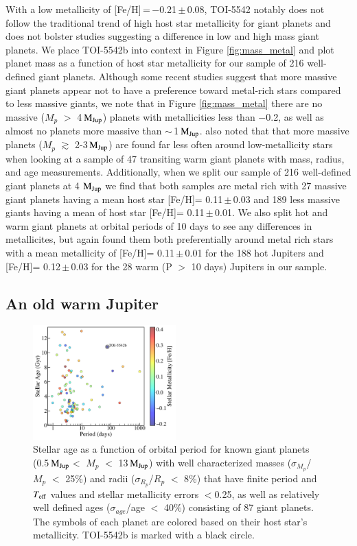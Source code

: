 \documentclass{aa}
\newcommand{\feh}{\mbox{[Fe/H]}\xspace}
\newcommand{\teff}{\ensuremath{T_{\rm eff}}\xspace}
\newcommand{\mjup}{\mbox{$\mathrm{M_{\rm Jup}}$}\xspace}
\begin{document}
With a low metallicity of \feh\,=\,$-$0.21\,$\pm$\,0.08, TOI-5542 notably does not follow the traditional trend of high host star metallicity for giant planets and does not bolster studies suggesting a difference in low and high mass giant planets. We place TOI-5542b into context in Figure \ref{fig:mass_metal} and plot planet mass as a function of host star metallicity for our sample of 216 well-defined giant planets. Although some recent studies suggest that more massive giant planets appear not to have a preference toward metal-rich stars compared to less massive giants, we note that in Figure \ref{fig:mass_metal} there are no massive ($M_{p}$ $>$ 4\,\mjup) planets with metallicities less than $-$0.2, as well as almost no planets more massive than $\sim$\,1\,\mjup. \citet{Thorngren2016} also noted that that more massive planets ($M_{p}$ $\gtrsim$ 2-3\,\mjup) are found far less often around low-metallicity stars when looking at a sample of 47 transiting warm giant planets with mass, radius, and age measurements. Additionally, when we split our sample of 216 well-defined giant planets at 4 \mjup we find that both samples are metal rich with 27 massive giant planets having a mean host star \feh = 0.11\,$\pm$\,0.03 and 189 less massive giants having a mean of host star \feh = 0.11\,$\pm$\,0.01. We also split hot and warm giant planets at orbital periods of 10 days to see any differences in metallicites, but again found them both preferentially around metal rich stars with a mean metallicity of \feh = 0.11\,$\pm$\,0.01 for the 188 hot Jupiters and \feh = 0.12\,$\pm$\,0.03 for the 28 warm (P $>$ 10 days) Jupiters in our sample.

\subsection{An old warm Jupiter}

\begin{figure}
  \centering
  \includegraphics[width=0.49\textwidth]{figures/age_period_metal.pdf}
 \caption{Stellar age as a function of orbital period for known giant planets (0.5\,\mjup $<$ $M_p$ $<$ 13\,\mjup) with well characterized masses ($\sigma_{M_p}$/$M_p$ $<$ 25\%) and radii ($\sigma_{R_p}$/$R_p$ $<$ 8\%) that have finite period and \teff values and stellar metallicity errors $<$0.25, as well as relatively well defined ages ($\sigma_{age}$/age $<$ 40\%) consisting of 87 giant planets. The symbols of each planet are colored based on their host star's metallicity. TOI-5542b is marked with a black circle.}
 \label{fig:age_period_metal}
\end{figure}
\end{document}
